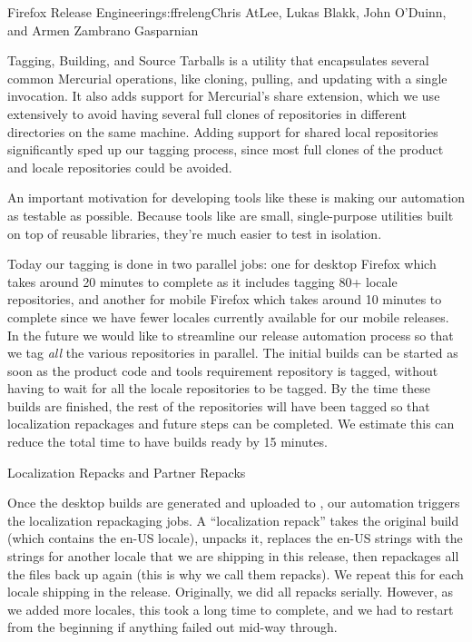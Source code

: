 \begin{aosachapter}{Firefox Release Engineering}{s:ffreleng}{Chris AtLee, Lukas Blakk, John O'Duinn, and Armen Zambrano Gasparnian}
\begin{aosasect1}{Tagging, Building, and Source Tarballs}
 is a utility that encapsulates several common Mercurial
operations, like cloning, pulling, and updating with a single invocation. It
also adds support for Mercurial's share extension, which we use extensively
to avoid having several full clones of repositories in
different directories on the same machine.  Adding support for shared
local repositories significantly sped up our tagging process, since most
full clones of the product and locale repositories could be avoided.
    
An important motivation for developing tools like these is 
making our automation as testable as possible. Because tools like
 are small, single-purpose utilities built on top of
reusable libraries, they're much easier to test in isolation.

Today our tagging is done in two parallel jobs: one for desktop
Firefox which takes around 20 minutes to complete as it includes
tagging 80+ locale repositories, and another for mobile Firefox which takes
around 10 minutes to complete since we have fewer locales currently
available for our mobile releases. In the future we would like to
streamline our release automation process so that we tag \emph{all}
the various repositories in parallel. The initial builds can be
started as soon as the product code and tools requirement
repository is tagged, without having to wait for all the locale
repositories to be tagged. By the time these builds are finished, the
rest of the repositories will have been tagged so that localization
repackages and future steps can be completed.  We estimate this can
reduce the total time to have builds ready by 15 minutes.

\end{aosasect1}

\begin{aosasect1}{Localization Repacks and Partner Repacks}

Once the desktop builds are generated and uploaded to
, our automation triggers the localization
repackaging jobs. A ``localization repack'' takes the original 
build (which contains the en-US locale), unpacks it, replaces
the en-US strings with the strings for another locale that we
are shipping in this release, then repackages all the files back
up again (this is why we call them repacks). We repeat this 
for each locale shipping in the release. Originally, we did all 
repacks serially. However, as we added more locales, this took 
a long time to complete, and we had to restart from the beginning 
if anything failed out mid-way through. 


\end{aosasect1}
\end{aosachapter}
